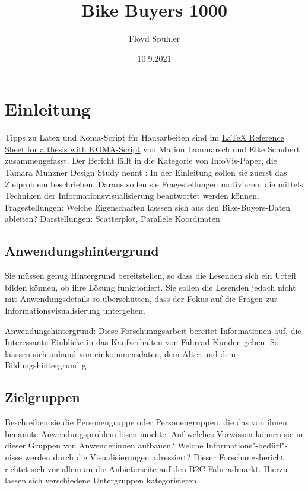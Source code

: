 \documentclass[usegeometry=true]{scrartcl}
\begin{document}
\subject{Projektbericht zum Modul Information Retrieval und Visualisierung Sommersemester 2021}
\title{Bike Buyers 1000}
\author{Floyd Spuhler}%
\date{10.9.2021}
\maketitle%

\section{Einleitung}
Tipps zu Latex und Koma-Script für Hausarbeiten sind im \href{http://mirrors.ctan.org/info/latex-refsheet/LaTeX_RefSheet.pdf}{LaTeX Reference Sheet for a thesis with KOMA-Script} von Marion Lammarsch und Elke Schubert zusammengefasst. 
Der Bericht fällt in die Kategorie von InfoVis-Paper, die Tamara Munzner Design Study nennt \cite{Munzner2008}: In der Einleitung sollen sie zuerst das Zielproblem beschrieben. Daraus sollen sie Fragestellungen motivieren, die mittels Techniken der Informationsvisualisierung beantwortet werden können. \newline
\newline Fragestellungen: Welche Eigenschaften lasssen sich aus den Bike-Buyers-Daten ableiten? Darstellungen: Scatterplot, Parallele Koordinaten

\subsection{Anwendungshintergrund}
Sie müssen genug Hintergrund bereitstellen, so dass die Lesenden sich ein Urteil bilden können, ob ihre Lösung funktioniert. Sie sollen die Lesenden jedoch nicht mit Anwendungsdetails so überschütten, dass der Fokus auf die Fragen zur Informationsvisualisierung untergehen. 

Anwendungshintergrund: Diese Forschunngsarbeit bereitet Informationen auf, die Interessante Einblicke in das Kaufverhalten von Fahrrad-Kunden geben. So laassen sich anhand von einkommensdaten, dem Alter und dem Bildungshintergrund g 


\subsection{Zielgruppen}
Beschreiben sie die Personengruppe oder Personengruppen, die das von ihnen benannte Anwendungsproblem lösen möchte. Auf welches Vorwissen können sie in dieser Gruppen von Anwenderinnen aufbauen? Welche Informations"-bedürf"-nisse werden durch die Visualisierungen adressiert?
Dieser Forschungsbericht richtet sich vor allem an die Anbieterseite auf den B2C Fahrradmarkt. Hierzu lassen sich verschiedene Untergruppen kategorisieren.
 
\end{document}
